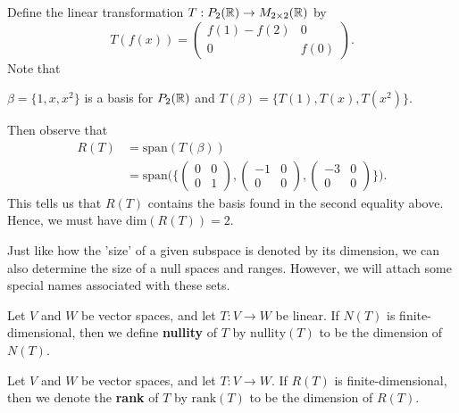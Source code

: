 \begin{eg}
    Define the linear transformation \( T: P_{2}(\mathbb{R}) \to M_{2 \times 2}(\mathbb{R}) \) by 
    \[  T(f(x)) = \begin{pmatrix}
        f(1) - f(2) & 0 \\
        0 & f(0)
    \end{pmatrix}. \]
    Note that 
    \begin{center}
        \( \beta = \{ 1,x, x^{2} \}  \) is a basis for \( P_{2}(\mathbb{R})  \) and \( T(\beta) = \{ T(1), T(x), T(x^{2}) \}. \)
    \end{center}
    Then observe that
    \begin{align*}
        R(T) &= \text{span}(T(\beta)) \\
             &= \text{span}\Big( \Big\{ \begin{pmatrix}
                         0 & 0 \\
                         0 & 1 
             \end{pmatrix}, \begin{pmatrix}
                         -1 & 0 \\
                         0 & 0 
             \end{pmatrix}, \begin{pmatrix}
                         -3 & 0 \\ 
                         0 & 0 
             \end{pmatrix} \Big\}  \Big).
    \end{align*}
    This tells us that \( R(T) \) contains the basis found in the second equality above. Hence, we must have \( \text{dim}(R(T)) = 2  \). 
\end{eg}

Just like how the 'size' of a given subspace is denoted by its dimension, we can also determine the size of a null spaces and ranges. However, we will attach some special names associated with these sets.
\begin{definition}[Nullity]\label{Nullity}
    Let \( V  \) and \( W  \) be vector spaces, and let \( T: V \to W  \) be linear. If \( N(T)  \) is finite-dimensional, then we define \textbf{nullity} of \( T  \) by \( \text{nullity}(T)  \) to be the dimension of \( N(T) \).
\end{definition}

\begin{definition}[Rank]\label{Rank}
    Let \( V  \) and \( W  \) be vector spaces, and let \( T: V \to W  \). If \( R(T)  \) is finite-dimensional, then we denote the \textbf{rank} of \( T  \) by \( \text{rank}(T) \) to be the dimension of \( R(T) \). 
\end{definition}

